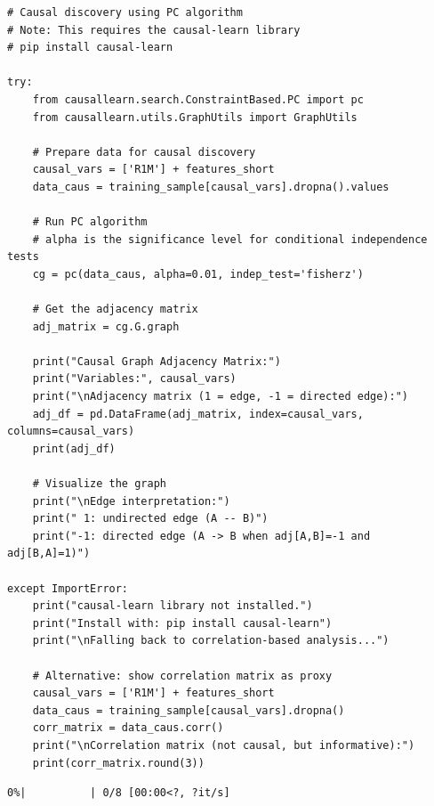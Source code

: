 \begin{verbatim}
# Causal discovery using PC algorithm
# Note: This requires the causal-learn library
# pip install causal-learn

try:
    from causallearn.search.ConstraintBased.PC import pc
    from causallearn.utils.GraphUtils import GraphUtils
    
    # Prepare data for causal discovery
    causal_vars = ['R1M'] + features_short
    data_caus = training_sample[causal_vars].dropna().values
    
    # Run PC algorithm
    # alpha is the significance level for conditional independence tests
    cg = pc(data_caus, alpha=0.01, indep_test='fisherz')
    
    # Get the adjacency matrix
    adj_matrix = cg.G.graph
    
    print("Causal Graph Adjacency Matrix:")
    print("Variables:", causal_vars)
    print("\nAdjacency matrix (1 = edge, -1 = directed edge):")
    adj_df = pd.DataFrame(adj_matrix, index=causal_vars, columns=causal_vars)
    print(adj_df)
    
    # Visualize the graph
    print("\nEdge interpretation:")
    print(" 1: undirected edge (A -- B)")
    print("-1: directed edge (A -> B when adj[A,B]=-1 and adj[B,A]=1)")
    
except ImportError:
    print("causal-learn library not installed.")
    print("Install with: pip install causal-learn")
    print("\nFalling back to correlation-based analysis...")
    
    # Alternative: show correlation matrix as proxy
    causal_vars = ['R1M'] + features_short
    data_caus = training_sample[causal_vars].dropna()
    corr_matrix = data_caus.corr()
    print("\nCorrelation matrix (not causal, but informative):")
    print(corr_matrix.round(3))
\end{verbatim}

\begin{verbatim}
0%|          | 0/8 [00:00<?, ?it/s]
\end{verbatim}

